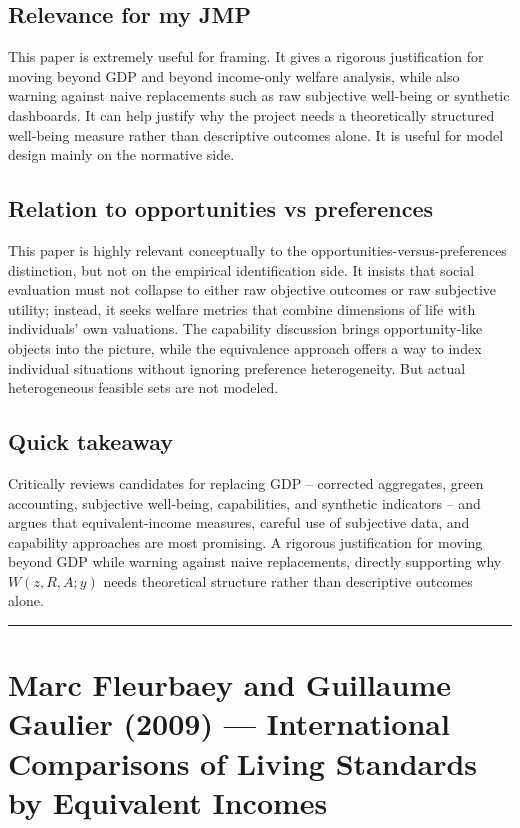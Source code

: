 \documentclass[11pt,a4paper]{article}
\begin{document}
\subsection*{Relevance for my JMP}
This paper is extremely useful for framing. It gives a rigorous justification for moving beyond GDP and beyond income-only welfare analysis, while also warning against naive replacements such as raw subjective well-being or synthetic dashboards. It can help justify why the project needs a theoretically structured well-being measure rather than descriptive outcomes alone. It is useful for model design mainly on the normative side.

\subsection*{Relation to opportunities vs preferences}
This paper is highly relevant conceptually to the opportunities-versus-preferences distinction, but not on the empirical identification side. It insists that social evaluation must not collapse to either raw objective outcomes or raw subjective utility; instead, it seeks welfare metrics that combine dimensions of life with individuals’ own valuations. The capability discussion brings opportunity-like objects into the picture, while the equivalence approach offers a way to index individual situations without ignoring preference heterogeneity. But actual heterogeneous feasible sets are not modeled.

\subsection*{Quick takeaway}
Critically reviews candidates for replacing GDP -- corrected aggregates, green accounting, subjective well-being, capabilities, and synthetic indicators -- and argues that equivalent-income measures, careful use of subjective data, and capability approaches are most promising. A rigorous justification for moving beyond GDP while warning against naive replacements, directly supporting why $W(z,R,A;y)$ needs theoretical structure rather than descriptive outcomes alone.


\medskip\hrule\medskip

\section*{Marc Fleurbaey and Guillaume Gaulier (2009) — International Comparisons of Living Standards by Equivalent Incomes}
\end{document}
